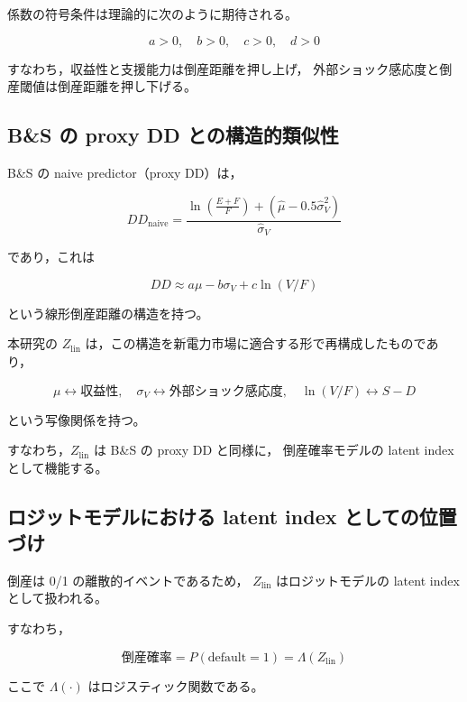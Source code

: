 係数の符号条件は理論的に次のように期待される。



\[
a>0,\quad b>0,\quad c>0,\quad d>0
\]



すなわち，収益性と支援能力は倒産距離を押し上げ，
外部ショック感応度と倒産閾値は倒産距離を押し下げる。

\subsection{B\&S の proxy DD との構造的類似性}

B\&S の naive predictor（proxy DD）は，



\[
DD_{\text{naive}}
= \frac{\ln\left(\frac{E+F}{F}\right) + (\hat{\mu}-0.5\hat{\sigma}_V^2)}{\hat{\sigma}_V}
\]



であり，これは



\[
DD \approx a\mu - b\sigma_V + c\ln(V/F)
\]



という線形倒産距離の構造を持つ。

本研究の $Z_{\text{lin}}$ は，この構造を新電力市場に適合する形で再構成したものであり，



\[
\mu \leftrightarrow \text{収益性},\quad
\sigma_V \leftrightarrow \text{外部ショック感応度},\quad
\ln(V/F) \leftrightarrow S - D
\]



という写像関係を持つ。

すなわち，$Z_{\text{lin}}$ は B\&S の proxy DD と同様に，
倒産確率モデルの latent index として機能する。

\subsection{ロジットモデルにおける latent index としての位置づけ}

倒産は 0/1 の離散的イベントであるため，
$Z_{\text{lin}}$ はロジットモデルの latent index として扱われる。

すなわち，



\[
\text{倒産確率} = P(\text{default}=1)
= \Lambda(Z_{\text{lin}})
\]



ここで $\Lambda(\cdot)$ はロジスティック関数である。

